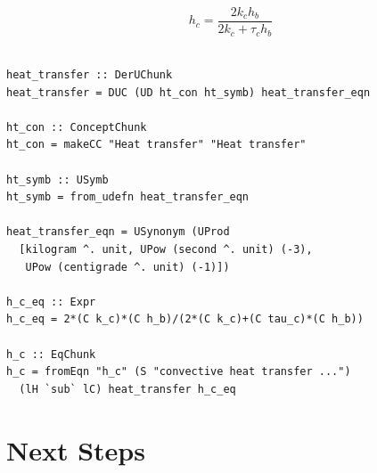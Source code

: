 \documentclass{beamer}
\begin{document}
\hoffset=0in %


\hoffset=-0.8in %
\begin{frame}


$$h_{c} = \frac{2k_{c} h_{b}}{2k_{c}+\tau_{c}h_{b}}$$

\begin{lstlisting}[frame=none, showstringspaces=false, basicstyle=\footnotesize]

heat_transfer :: DerUChunk
heat_transfer = DUC (UD ht_con ht_symb) heat_transfer_eqn

ht_con :: ConceptChunk
ht_con = makeCC "Heat transfer" "Heat transfer"

ht_symb :: USymb
ht_symb = from_udefn heat_transfer_eqn

heat_transfer_eqn = USynonym (UProd 
  [kilogram ^. unit, UPow (second ^. unit) (-3),
   UPow (centigrade ^. unit) (-1)])

h_c_eq :: Expr
h_c_eq = 2*(C k_c)*(C h_b)/(2*(C k_c)+(C tau_c)*(C h_b))

h_c :: EqChunk
h_c = fromEqn "h_c" (S "convective heat transfer ...") 
  (lH `sub` lC) heat_transfer h_c_eq

\end{lstlisting}

\end{frame}

\hoffset=0in %


\section[Next Steps]{Next Steps}

\end{document}
